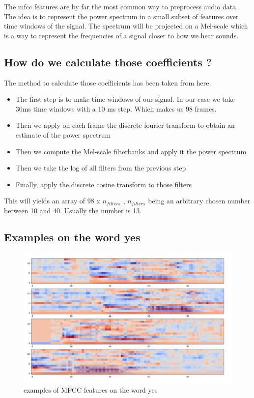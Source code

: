 The mfcc features are by far the most common way to preprocess audio data. The idea is to represent the power spectrum in a small subset of features over time windows of the signal. The spectrum will be projected on a Mel-scale which is a way to represent the frequencies of a signal closer to how we hear sounds.

\subsection{How do we calculate those coefficients ?}

The method to calculate those coefficients has been taken from here.

\begin{itemize}
    \item The first step is to make time windows of our signal. In our case we take 30ms time windows with a 10 ms step. Which makes us 98 frames.
    \item Then we apply on each frame the discrete fourier transform to obtain an estimate of the power spectrum
    \item Then we compute the Mel-scale filterbanks and apply it the power spectrum
    \item Then we take the log of all filters from the previous step
    \item Finally, apply the discrete cosine transform to those filters
\end{itemize}

This will yields an array of $98 $ x $ n_{filters}$ , $ n_{filters}$ being an arbitrary chosen number between 10 and 40. Usually the number is 13.

\newpage

\subsection{Examples on the word yes}

\begin{figure}[!h]
    \centering
    \includegraphics[width=1\textwidth]{chapters/pictures/mfcc_yes.PNG}
    \caption{examples of MFCC features on the word yes}
    \label{fig:mfcc_yes}
\end{figure}

